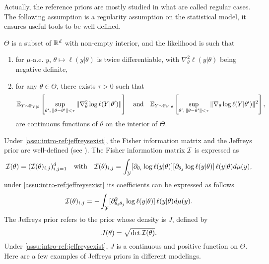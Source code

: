 Actually, the reference priors are mostly studied in what are called regular cases.
The following assumption is a regularity assumption on the statistical model, it ensures useful tools to be well-defined.
\begin{assu}\label{assu:intro-ref:jeffreysexist}
    $\Theta$ is a subset of $\mathbb{R}^d$ with non-empty interior, and the likelihood is such that
    \begin{enumerate}
        \item for $\mu$-a.e. $y$, $\theta\mapsto\ell(y|\theta)$ is twice differentiable, with $\nabla^2_\theta\ell(y|\theta)$ being negative definite,
        \item for any $\theta\in\Theta$, there exists $\tau>0$ %
        such that %
        \begin{equation}
            \mathbb{E}_{Y\sim\mathbb{P}_{Y|\theta}}\left[\sup_{\theta',\,\|\theta-\theta'\|<\tau} \|\nabla^2_\theta\log\ell(Y|\theta')\| \right]\quad\text{and}\quad \mathbb{E}_{Y\sim\mathbb{P}_{Y|\theta}}\left[\sup_{\theta',\,\|\theta-\theta'\|<\tau}\|\nabla_\theta\log\ell(Y|\theta')\|^2\right],
        \end{equation}
        are continuous functions of $\theta$ on the interior of $\Theta$.
    \end{enumerate}
\end{assu}

Under \cref{assu:intro-ref:jeffreysexist}, the Fisher information matrix and the Jeffreys prior are well-defined (see \cite{lehmann_elements_1999}). The Fisher information matrix $\mathcal{I}$ is expressed as
    \begin{equation}
        \mathcal{I}(\theta) = (\mathcal{I}(\theta)_{i,j})_{i,j=1}^d\quad \text{with}\quad \mathcal{I}(\theta)_{i,j}= \int_{\mathcal{Y}}[\partial_{\theta_i}\log\ell(y|\theta)]
        [\partial_{\theta_j}\log\ell(y|\theta)]\, \ell(y|\theta)d\mu(y),
    \end{equation}
under \cref{assu:intro-ref:jeffreysexist} its coefficients can be expressed as follows
    \begin{equation}
       \mathcal{I}(\theta)_{i,j}= - \int_{\mathcal{Y}}[\partial^2_{\theta_i\theta_j}\log\ell(y|\theta)]\, \ell(y|\theta)d\mu(y).
    \end{equation}
The Jeffreys prior refers to the prior whose density is $J$, defined by
    \begin{equation}
        J(\theta) = \sqrt{\det\mathcal{I}(\theta)}.
    \end{equation}
Under \cref{assu:intro-ref:jeffreysexist}, $J$ is a continuous and positive function on $\Theta$. {Here are a few examples of Jeffreys priors in different modelings.}



